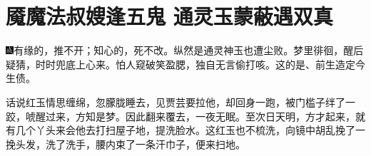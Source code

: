 

\chapter{魇魔法叔嫂逢五鬼 通灵玉蒙蔽遇双真}

{\includegraphics[width=3mm]{../Images/00005}有缘的，推不开；知心的，死不改。纵然是通灵神玉也遭尘败。梦里徘徊，醒后疑猜，时时兜底上心来。怕人窥破笑盈腮，独自无言偷打咳。这的是、前生造定今生债。}

话说红玉情思缠绵，忽朦胧睡去，见贾芸要拉他，却回身一跑，被门槛子绊了一跤，唬醒过来，方知是梦。因此翻来覆去，一夜无眠。至次日天明，方才起来，就有几个丫头来会他去打扫屋子地，提洗脸水。这红玉也不梳洗，向镜中胡乱挽了一挽头发，洗了洗手，腰内束了一条汗巾子，便来扫地。

